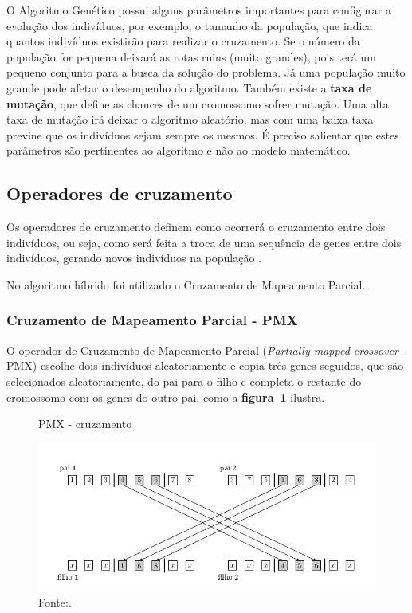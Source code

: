 \documentclass[12pt,openright,a4paper,twoside]{tcc}
\begin{document}
		O Algoritmo Genético possui alguns parâmetros importantes para configurar a evolução dos indivíduos, por exemplo, o tamanho da população, que indica quantos indivíduos existirão para realizar o cruzamento. Se o número da população for pequena deixará as rotas ruins (muito grandes), pois terá um pequeno conjunto para a busca da solução do problema. Já uma população muito grande pode afetar o desempenho do algoritmo. Também  existe a \textbf{taxa de mutação}, que define as chances de um cromossomo sofrer mutação. Uma alta taxa de mutação irá deixar o algoritmo aleatório, mas com uma baixa taxa previne que os indivíduos sejam sempre os mesmos. É preciso salientar que estes parâmetros são pertinentes ao algoritmo e não ao modelo matemático.

		\subsection{Operadores de cruzamento}

			Os operadores de cruzamento definem como ocorrerá o cruzamento entre dois indivíduos, ou seja, como será feita a troca de uma sequência de genes entre dois indivíduos, gerando novos indivíduos na população \cite{0012-pdf}.

			No algoritmo híbrido foi utilizado o Cruzamento de Mapeamento Parcial.

		\subsubsection{Cruzamento de Mapeamento Parcial - PMX} 
			\label{Spmx}
			O operador de Cruzamento de Mapeamento Parcial (\textit{Partially-mapped crossover} - PMX) escolhe dois indivíduos aleatoriamente e copia três genes seguidos, que são selecionados aleatoriamente, do pai para o filho e completa o restante do cromossomo com os genes do outro pai, como a \textbf{figura~\ref{pmx}} ilustra.

			\begin{figure}[h]
				\centering
                \caption{PMX - cruzamento}
		        \includegraphics[width = 14cm,keepaspectratio]{img/pmx.png}
		        \caption*{Fonte:\cite{0012-pdf}.}
		        \label{pmx}
	   		\end{figure}
\end{document}
